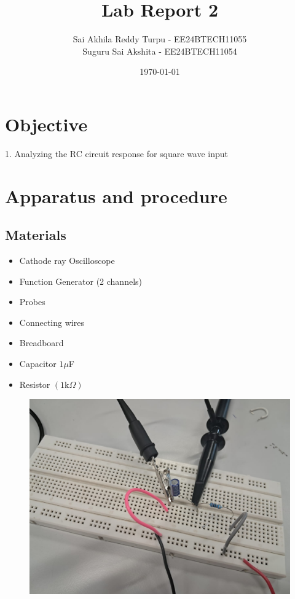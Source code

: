 \documentclass[a4paper,12pt]{article}
\title{\textbf{Lab Report 2}}
\author{Sai Akhila Reddy Turpu - EE24BTECH11055 \\Suguru Sai Akshita - EE24BTECH11054 }
\date{\today}
\begin{document}
\maketitle
\tableofcontents
\newpage

\section{Objective}

1. Analyzing the RC circuit response for square wave input\\
\section{Apparatus and procedure}
\subsection{Materials}
\begin{itemize}
    \item Cathode ray Oscilloscope
    \item Function Generator (2 channels)
    \item Probes
    \item Connecting wires
    \item Breadboard
    \item Capacitor $1 \mu $F
    \item Resistor $(1\text{k}\Omega)$
\end{itemize}


\begin{figure}[h]
    \centering
    \includegraphics[width=\textwidth]{figs/circuit.jpeg}
\end{figure}
\end{document}
